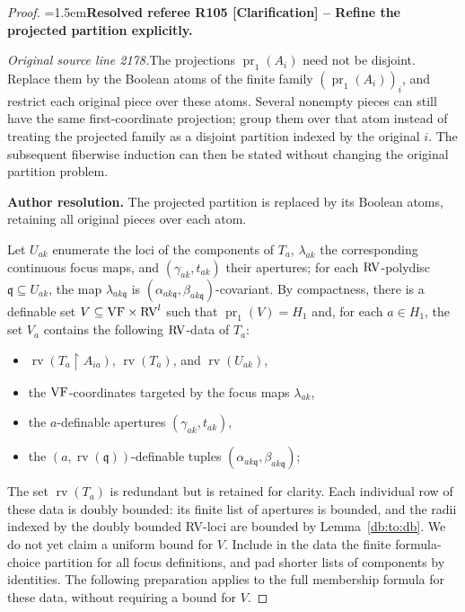 \documentclass[12pt]{amsart}
\newcommand{\ResolvedRefereeRemark}[5]{%
  \par\medskip\begingroup\normalfont\small\color{gray}%
  \emergencystretch=1.5em\noindent\textbf{Resolved referee R#1 [#2] -- #3.}\par\nobreak\noindent #4\par
  \medskip\color{ResolutionGreen}\noindent\textbf{Author resolution.} #5\par
  \endgroup\medskip
}
\theoremstyle{plain}
\theoremstyle{definition}
\theoremstyle{remark}
\numberwithin{equation}{section}
\theoremstyle{plain}
\newcommand{\VF}{\textup{VF}}
\newcommand{\RV}{\textup{RV}}
\DeclareMathOperator{\pr}{pr}
\newcommand{\gq}{\mathfrak{q}}
\newcommand{\0}{\emptyset}
\newcommand{\rest}{\upharpoonright}
\newcommand{\sub}{\subseteq}
\DeclareMathOperator{\rv}{rv}
\begin{document}
\begin{proof}
\ResolvedRefereeRemark{105}{Clarification}{Refine the projected partition explicitly}{%
\textit{Original source line 2178.}\quad The projections $\pr_1(A_i)$ need not be disjoint. Replace them by the Boolean atoms of the finite family $(\pr_1(A_i))_i$, and restrict each original piece over these atoms. Several nonempty pieces can still have the same first-coordinate projection; group them over that atom instead of treating the projected family as a disjoint partition indexed by the original $i$. The subsequent fiberwise induction can then be stated without changing the original partition problem.
}{The projected partition is replaced by its Boolean atoms, retaining all original pieces over each atom.}


Let $U_{ak}$ enumerate the loci of the components of $T_{a}$, $\lambda_{ak}$ the corresponding continuous focus maps, and $(\gamma_{ak}, t_{ak})$ their apertures; for each $\RV$-polydisc $\gq \sub U_{ak}$, the map $\lambda_{ak\gq}$ is $(\alpha_{ak\gq}, \beta_{ak\gq})$-covariant. By compactness, there is a definable set $V \sub \VF \times \RV^l$ such that $\pr_1(V) = H_1$ and, for each $a \in H_1$, the set $V_a$ contains the following $\RV$-data of $T_a$:
\begin{itemize}
  \item $\rv(T_{a} \rest A_{ia})$, $\rv(T_{a})$, and $\rv(U_{ak})$,
  \item the $\VF$-coordinates targeted by the focus maps $\lambda_{ak}$,
  \item the $a$-definable apertures $(\gamma_{ak}, t_{ak})$,
   \item the $(a, \rv(\gq))$-definable tuples $(\alpha_{ak\gq}, \beta_{ak\gq})$;
\end{itemize}
The set $\rv(T_a)$ is redundant but is retained for clarity. Each individual row of these data is doubly bounded: its finite list of apertures is bounded, and the radii indexed by the doubly bounded RV-loci are bounded by Lemma~\ref{db:to:db}. We do not yet claim a uniform bound for $V$. Include in the data the finite formula-choice partition for all focus definitions, and pad shorter lists of components by identities. The following preparation applies to the full membership formula for these data, without requiring a bound for $V$.


\end{proof}
\end{document}
